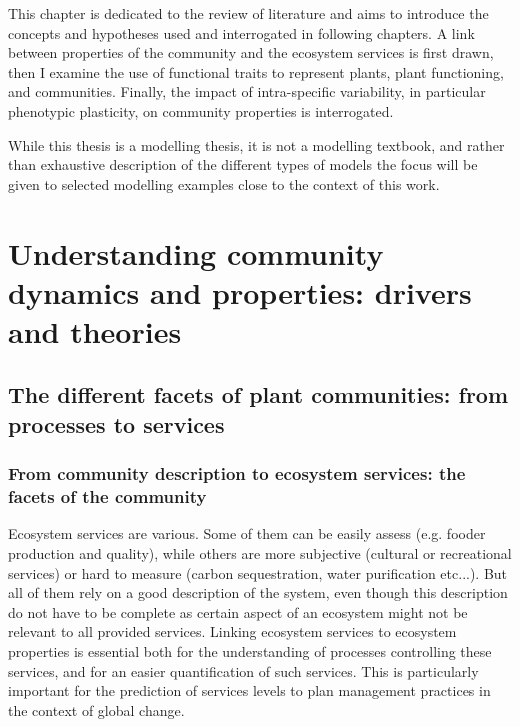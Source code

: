 \begin{fullwidth}
This chapter is dedicated to the review of literature and aims to introduce the concepts and hypotheses used and interrogated in following chapters. A link between properties of the community and the ecosystem services is first drawn, then I examine the use of functional traits to represent plants, plant functioning, and communities. Finally, the impact of intra-specific variability, in particular phenotypic plasticity, on community properties is interrogated.

While this thesis is a modelling thesis, it is not a modelling textbook, and rather than exhaustive description of the different types of models the focus will be given to selected modelling examples close to the context of this work.
\end{fullwidth}

\chapter{Understanding community dynamics and properties: drivers and theories}

\section{The different facets of plant communities: from processes to services}



\subsection{From community description to ecosystem services: the facets of the community}

Ecosystem services are various. Some of them can be easily assess (e.g. fooder production and quality), while others are more subjective (cultural or recreational services) or hard to measure (carbon sequestration, water purification etc...). But all of them rely on a good description of the system, even though this description do not have to be complete as certain aspect of an ecosystem might not be relevant to all provided services. Linking ecosystem services to ecosystem properties is essential both for the understanding of processes controlling these services, and for an easier quantification of such services. This is particularly important for the prediction of services levels to plan management practices in the context of global change.

